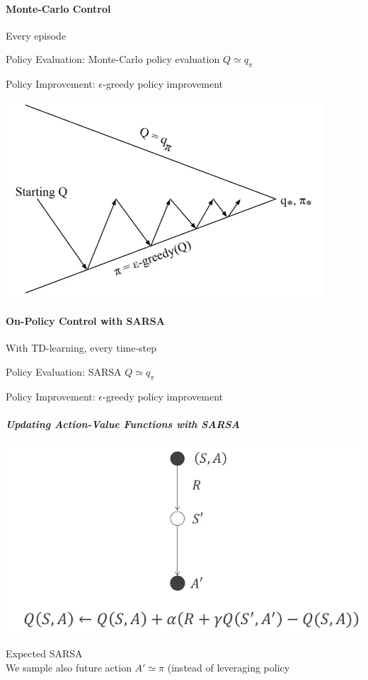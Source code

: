 \documentclass[10pt]{report}
\begin{document}
\paragraph{Monte-Carlo Control} Every episode
\begin{list}{}{}
	\item Policy Evaluation: Monte-Carlo policy evaluation $Q\simeq q_\pi$
	\item Policy Improvement: $\epsilon$-greedy policy improvement
\end{list}
\begin{center}
	\includegraphics[scale=0.5]{172.png}
\end{center}
\paragraph{On-Policy Control with SARSA} With TD-learning, every time-step
\begin{list}{}{}
	\item Policy Evaluation: SARSA $Q\simeq q_\pi$
	\item Policy Improvement: $\epsilon$-greedy policy improvement
\end{list}
\subparagraph{Updating Action-Value Functions with SARSA}
\begin{center}
	\includegraphics[scale=0.5]{173.png}
\end{center}
Expected SARSA\\
We sample also future action $A'\simeq \pi$ (instead of leveraging policy %
\end{document}
